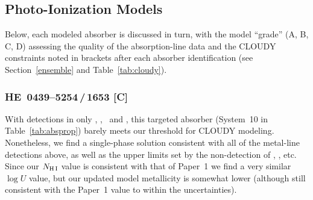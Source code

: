 \documentclass[twocolumn,twocolappendix,tighten,times]{aastex6}
\newcommand{\HI}{\ion{H}{1}}
\newcommand{\CII}{\ion{C}{2}}
\newcommand{\CIV}{\ion{C}{4}}
\newcommand{\NV}{\ion{N}{5}}
\newcommand{\SiIII}{\ion{Si}{3}}
\newcommand{\SiIV}{\ion{Si}{4}}
\newcommand{\kms}{\ensuremath{{\rm km\,s}^{-1}}}
\begin{document}



\subsection{Photo-Ionization Models}
\label{indiv:cloudy}

Below, each modeled absorber is discussed in turn, with the model ``grade'' 
(A, B, C, D) assessing the quality of the absorption-line data and the CLOUDY 
constraints noted in brackets after each absorber identification (see 
Section~\ref{ensemble} and Table~\ref{tab:cloudy}).


\subsubsection{HE~0439--5254\,/\,1653 [C]}
\label{indiv:cloudy:he0439_1653}

With detections in only \HI, \CIV, \SiIII\ and \SiIV, this targeted absorber 
(System~10 in Table~\ref{tab:absprop}) barely meets our threshold for CLOUDY 
modeling. Nonetheless, we find a single-phase solution consistent with all of 
the metal-line detections above, as well as the upper limits set by the 
non-detection of \CII, \NV, etc. Since our $N_{\rm H\,I}$ value is consistent 
with that of Paper~1 we find a very similar $\log{U}$ value, but our updated 
model metallicity is somewhat lower (although still consistent with the Paper~1 
value to within the uncertainties).
\end{document}
